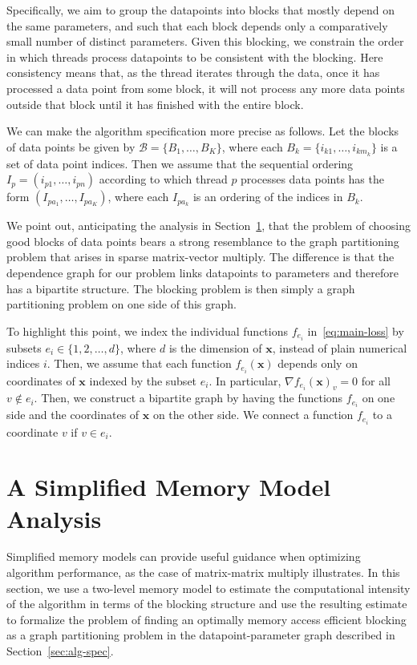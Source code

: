 \documentclass[times,11pt]{article}
\numberwithin{equation}{section}		%
\numberwithin{figure}{section}			%
\numberwithin{table}{section}				%
\newcommand{\xvec}{\mathbf{x}}
\newcommand{\blocks}{\mathcal{B}}
\begin{document}
Specifically, we aim to group the datapoints into blocks that mostly depend on the same parameters, and such that each block depends only a comparatively small number of 
distinct parameters. Given this blocking, we constrain the order in which threads process datapoints to be consistent with the blocking. Here consistency means that, as the thread iterates through
the data, once it has processed a data point from some block, it will not process any more data points outside that block until it has finished with the entire block.

We can make the algorithm specification more precise as follows. Let the blocks of data points be given by $\blocks = \lbrace B_{1}, \dots, B_{K} \rbrace$, where each $B_{k} = \lbrace i_{k1}, \dots, i_{km_{k}}\rbrace$ is a set of data point indices. Then we assume that the sequential ordering
$I_{p} = \left(i_{p1}, \dots, i_{pn}\right)$ according to which thread $p$ processes data points has the form $\left(I_{pa_{1}}, \dots, I_{pa_{K}}\right)$, where each $I_{pa_{k}}$ is an ordering of the indices in $B_{k}$. 

We point out, anticipating the analysis in Section~\ref{sec:memory-model}, that the problem of choosing good blocks of data points  bears a strong resemblance to the graph partitioning problem that arises in sparse matrix-vector multiply. The difference is that the dependence graph for our problem
links datapoints to parameters and therefore has a bipartite structure. The blocking problem is then simply a graph partitioning problem on one side of this graph. 

To highlight this point, we index the individual functions $f_{e_i}$ in~\eqref{eq:main-loss} by subsets $e_i \in \lbrace 1, 2, \ldots, d \rbrace$, where $d$ is the dimension of $\xvec$, instead of plain numerical indices $i$. Then, we 
assume that each function $f_{e_i}(\xvec)$ depends only on coordinates of $\xvec$ indexed by the subset $e_i$. In particular, $\nabla f_{e_i}(\xvec)_v = 0$ for all $v\not \in e_i$. Then, we construct a bipartite graph by having the functions $f_{e_i}$ on one side and the coordinates of $\xvec$ on the other side. We connect a function $f_{e_i}$ to a coordinate $v$ if $v\in e_i$.   

\section{A Simplified Memory Model Analysis}\label{sec:memory-model}

Simplified memory models can provide useful guidance when optimizing algorithm performance, as the case of matrix-matrix multiply illustrates. In this section, we use a two-level memory model to estimate the computational intensity of the algorithm
in terms of the blocking structure and use the resulting estimate to formalize the problem of finding an optimally memory access efficient blocking as a graph partitioning problem in the datapoint-parameter graph described in Section~\ref{sec:alg-spec}.
\end{document}
